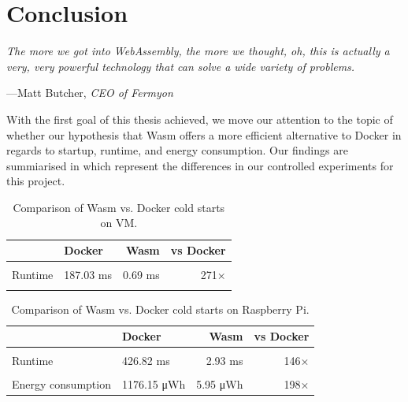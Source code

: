 \documentclass[
  table]{report}
\begin{document}
\newpage
\chapter{Conclusion}

\epigraph{\itshape  
The more we got into WebAssembly, the more we thought, oh, this is actually a very, very powerful technology that can solve a wide variety of problems.
}{---Matt Butcher, \textit{CEO of Fermyon}}

With the first goal of this thesis achieved, we move our attention to
the topic of whether our hypothesis that Wasm offers a more efficient
alternative to Docker in regards to startup, runtime, and energy
consumption. Our findings are summiarised in
 which represent the differences in our
controlled experiments for this project.

\begin{table}[H]
\centering
\caption{\label{tab:nrec_data_table}Comparison of Wasm vs. Docker cold starts on VM.\label{tab:nrec-avg}}
\centering
\begin{tabular}[t]{llrr}
\toprule
  & Docker & Wasm & vs Docker\\
\midrule
\cellcolor{gray!10}{Cold start} & \cellcolor{gray!10}{324.66 ms} & \cellcolor{gray!10}{0.89 ms} & \cellcolor{gray!10}{365×}\\
Runtime & 187.03 ms & 0.69 ms & 271×\\
\cellcolor{gray!10}{Total runtime} & \cellcolor{gray!10}{511.69 ms} & \cellcolor{gray!10}{1.58 ms} & \cellcolor{gray!10}{324×}\\
\bottomrule
\end{tabular}
\end{table}

\begin{table}[H]
\centering
\caption{\label{tab:rpi_data_table}Comparison of Wasm vs. Docker cold starts on Raspberry Pi.\label{tab:rpi-avg}}
\centering
\begin{tabular}[t]{llrr}
\toprule
  & Docker & Wasm & vs Docker\\
\midrule
\cellcolor{gray!10}{Cold start} & \cellcolor{gray!10}{692.36 ms} & \cellcolor{gray!10}{3.19 ms} & \cellcolor{gray!10}{217×}\\
Runtime & 426.82 ms & 2.93 ms & 146×\\
\cellcolor{gray!10}{Total runtime} & \cellcolor{gray!10}{1119.18 ms} & \cellcolor{gray!10}{6.12 ms} & \cellcolor{gray!10}{183×}\\
Energy consumption & 1176.15 μWh & 5.95 μWh & 198×\\
\bottomrule
\end{tabular}
\end{table}
\end{document}
